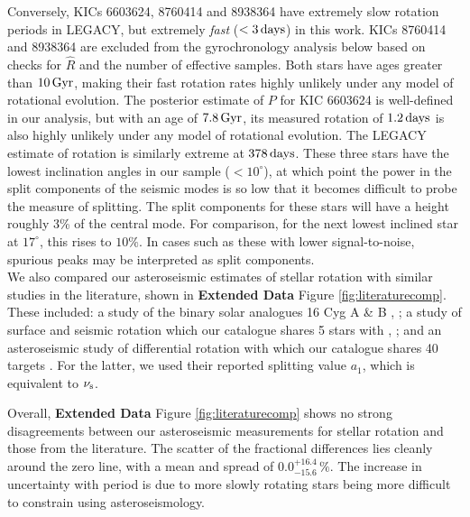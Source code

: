 Conversely, KICs 6603624, 8760414 and 8938364 have extremely slow rotation periods in LEGACY, but extremely \textit{fast} ($<3\, \rm {days}$) in this work. KICs 8760414 and 8938364 are excluded from the gyrochronology analysis below based on checks for $\hat{R}$ and the number of effective samples. Both stars have ages greater than $10\, \rm Gyr$, making their fast rotation rates highly unlikely under any model of rotational evolution. The posterior estimate of $P$ for KIC 6603624 is well-defined in our analysis, but with an age of $7.8\, \rm Gyr$, its measured rotation of $1.2\, \rm days$ is also highly unlikely under any model of rotational evolution. The LEGACY estimate of rotation is similarly extreme at $378\, \rm days$. These three stars have the lowest inclination angles in our sample ($< 10^\circ$), at which point the power in the split components of the seismic modes is so low that it becomes difficult to probe the measure of splitting. The split components for these stars will have a height roughly 3\% of the central mode. For comparison, for the next lowest inclined star at $17^\circ$, this rises to $10\%$. In cases such as these with lower signal-to-noise, spurious peaks may be interpreted as split components.\\

We also compared our asteroseismic estimates of stellar rotation with similar studies in the literature, shown in \textbf{Extended Data} Figure \ref{fig:literaturecomp}. These included: a study of the binary solar analogues 16 Cyg A \& B \cite{davies+2015}, ; a study of surface and seismic rotation which our catalogue shares 5 stars with \cite{nielsen+2015}, ; and an asteroseismic study of differential rotation with which our catalogue shares 40 targets \cite{benomar+2018}. For the latter, we used their reported splitting value $a_1$, which is equivalent to $\nu_{\rm s}$. 

Overall,  \textbf{Extended Data} Figure \ref{fig:literaturecomp} shows no strong disagreements between our asteroseismic measurements for stellar rotation and those from the literature. The scatter of the fractional differences lies cleanly around the zero line, with a mean and spread of $0.0_{-15.6}^{+16.4}\, \%$. The increase in uncertainty with period is due to more slowly rotating stars being more difficult to constrain using asteroseismology.


